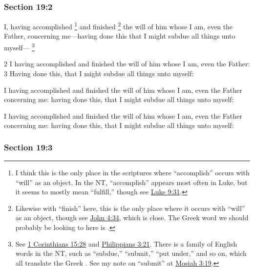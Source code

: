 	\subsubsection{Section 19:2} %
		\label{DC19-2}

		I, having accomplished%
			\footnote{%
				I think this is the only place in the scriptures where ``accomplish'' occurs with ``will'' as an object. In the NT, ``accomplish'' appears most often in Luke, but it seems to mostly mean ``fulfill,'' though see \hyperref[LUKE-9-31]{Luke 9:31}.
				}
		and finished%
			\footnote{%
				Likewise with ``finish'' here, this is the only place where it occurs with ``will'' as an object, though see \hyperref[JOHN-4-34]{John 4:34}, which is close. The Greek word we should probably be looking to here is \hyperref[TELEIOO]{}.
				}
		the will of him whose I am, even the Father, concerning me---having done this that I might subdue all things unto myself---%
			\footnote{%
				See \hyperref[1CORINTHIANS-15-28]{1 Corinthians 15:28} and \hyperref[PHILIPPIANS-3-21]{Philippians 3:21}. There is a family of English words in the NT, such as ``subdue,'' ``submit,'' ``put under,'' and so on, which all translate the Greek \hyperref[HUPOTASSO]{}. See my note on ``submit'' at \hyperref[MOSIAH-3-19]{Mosiah 3:19}.
				}

		\begin{framed}
		\scriptsize
			\begin{compactdesc}
				\item[JSP] 2 I having accomplished and finished the will of him whose I am, even the Father: 3 Having done this, that I might subdue all things unto myself:
				\item[RB1] [\textit{missing}]
				\item[DC 1835] I having accomplished and finished the will of him whose I am, even the Father concerning me: having done this, that I might subdue all things unto myself: 
				\item[DC 1844] I having accomplished and finished the will of him whose I am, even the Father concerning me: having done this, that I might subdue all things unto myself: 
			\end{compactdesc}
		\end{framed}

	\subsubsection{Section 19:3} %
		\label{DC19-3}

